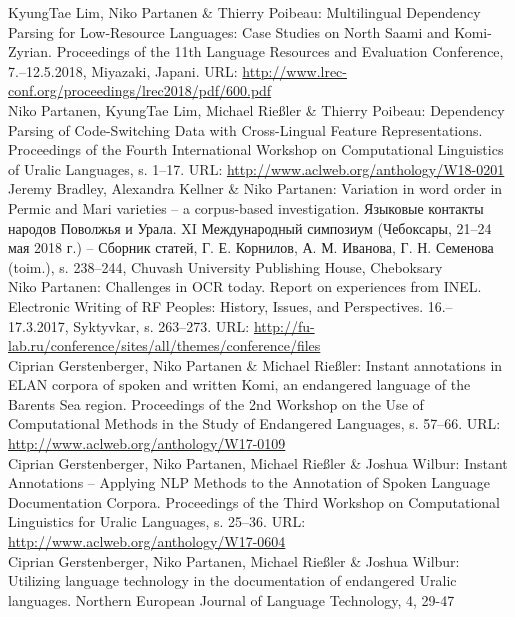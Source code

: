 \documentclass[11pt, a4paper]{article}
\newcommand{\years}[1]{\marginnote{\scriptsize #1}} %
\begin{document}
\years{2018} KyungTae Lim, Niko Partanen \& Thierry Poibeau: Multilingual Dependency Parsing for Low-Resource Languages: Case Studies on North Saami and Komi-Zyrian. Proceedings of the 11th Language Resources and Evaluation Conference, 7.--12.5.2018, Miyazaki, Japani. URL: \url{http://www.lrec-conf.org/proceedings/lrec2018/pdf/600.pdf}\\

\years{2018} Niko Partanen, KyungTae Lim, Michael Rießler \& Thierry Poibeau: Dependency Parsing of Code-Switching Data with Cross-Lingual Feature Representations. Proceedings of the Fourth International Workshop on Computational Linguistics of Uralic Languages, s. 1--17. URL: \url{http://www.aclweb.org/anthology/W18-0201}\\

\years{2018} Jeremy Bradley, Alexandra Kellner \& Niko Partanen: Variation in word order in Permic and Mari varieties – a corpus-based investigation. Языковые контакты народов Поволжья и Урала. XI Международный симпозиум (Чебоксары, 21–24 мая 2018 г.) – Сборник статей, Г. Е. Корнилов, А. М. Иванова, Г. Н. Семенова (toim.), s. 238–244, Chuvash University Publishing House, Cheboksary\\

\years{2017} Niko Partanen: Challenges in OCR today. Report on experiences from INEL. Electronic Writing of RF Peoples: History, Issues, and Perspectives. 16.--17.3.2017, Syktyvkar, s. 263--273. URL: \url{http://fu-lab.ru/conference/sites/all/themes/conference/files}\\

\years{2017} Ciprian Gerstenberger, Niko Partanen \& Michael Rießler: Instant annotations in ELAN corpora of spoken and written Komi, an endangered language of the Barents Sea region. Proceedings of the 2nd Workshop on the Use of Computational Methods in the Study of Endangered Languages, s. 57--66. URL: \url{http://www.aclweb.org/anthology/W17-0109}\\

\years{2017} Ciprian Gerstenberger, Niko Partanen, Michael Rießler \& Joshua Wilbur: Instant Annotations -- Applying NLP Methods to the Annotation of Spoken Language Documentation Corpora. Proceedings of the Third Workshop on Computational Linguistics for Uralic Languages, s. 25--36. URL: \url{http://www.aclweb.org/anthology/W17-0604}\\

\years{2016} Ciprian Gerstenberger, Niko Partanen, Michael Rießler \& Joshua Wilbur: Utilizing language technology in the documentation of endangered Uralic languages. Northern European Journal of Language Technology, 4, 29-47 \\
\end{document}
